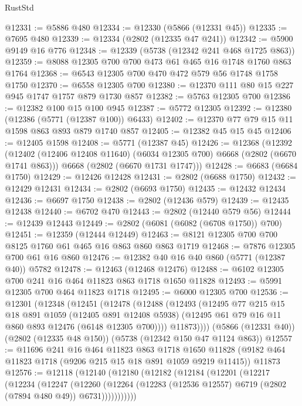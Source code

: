 \begin{lexlean}{RustStd}
\begin{coremodule}
@12331 := @5886 @480
@12334 := @12330 (@5866 (@12331 @45))
@12335 := @7695 @480
@12339 := @12334 (@2802 (@12335 @47 @241))
@12342 := @5900 @9149 @16 @776
@12348 := @12339 (@5738 (@12342 @241 @468 @1725 @863))
@12359 := @8088 @12305 @700 @700 @473 @61 @465 @16 @1748 @1760 @863 @1764
@12368 := @6543 @12305 @700 @470 @472 @579 @56 @1748 @1758 @1750
@12370 := @6558 @12305 @700
@12380 := @12370 @111 @80 @15 @227 @945 @1747 @1757 @879 @1730 @857
@12382 := @5763 @12305 @700
@12386 := @12382 @100 @15 @100 @945
@12387 := @5772 @12305
@12392 := @12380 (@12386 (@5771 (@12387 @100)) @6433)
@12402 := @12370 @77 @79 @15 @11 @1598 @863 @893 @879 @1740 @857
@12405 := @12382 @45 @15 @45
@12406 := @12405 @1598
@12408 := @5771 (@12387 @45)
@12426 := @12368
    (@12392
      (@12402 (@12406 @12408 @11640) (@6034 @12305 @700) @6668 (@2802 (@6670 @1741 @863)))
      @6668
      (@2802 (@6670 @1731 @1747)))
@12428 := @6683 (@6684 @1750)
@12429 := @12426 @12428
@12431 := @2802 (@6688 @1750)
@12432 := @12429 @12431
@12434 := @2802 (@6693 @1750)
@12435 := @12432 @12434
@12436 := @6697 @1750
@12438 := @2802 (@12436 @579)
@12439 := @12435 @12438
@12440 := @6702 @470
@12443 := @2802 (@12440 @579 @56)
@12444 := @12439 @12443
@12449 := @2802 (@6081 (@6082 (@6708 @1750)) @700)
@12451 := @12359 (@12444 @12449)
@12463 := @8121 @12305 @700 @700 @8125 @1760 @61 @465 @16 @863 @860 @863 @1719
@12468 := @7876 @12305 @700 @61 @16 @860
@12476 := @12382 @40 @16 @40 @860 (@5771 (@12387 @40)) @5782
@12478 := @12463 (@12468 @12476)
@12488 := @6102 @12305 @700 @241 @16 @464 @11823 @863 @1718 @1650 @11828
@12493 := @5991 @12305 @700 @464 @11823 @1718
@12495 := @6000 @12305 @700
@12536 := @12301
    (@12348
      (@12451
        (@12478
          (@12488
            (@12493
              (@12495
                @77
                @215
                @15
                @18
                @891
                @1059
                (@12405 @891 @12408 @5938)
                (@12495 @61 @79 @16 @11 @860 @893 @12476 (@6148 @12305 @700))))
            @11873))))
    (@5866 (@12331 @40))
    (@2802 (@12335 @48 @150))
    (@5738 (@12342 @150 @47 @1124 @863))
@12557 := @11696
    @241
    @16
    @464
    @11823
    @863
    @1718
    @1650
    @11828
    (@9182 @464 @11823 @1718 (@9206 @215 @15 @18 @891 @1059 @9219 @11415))
    @11873
@12576 := @12118
    (@12140
      (@12180
        (@12182
          (@12184
            (@12201
              (@12217
                (@12234
                  (@12247
                    (@12260
                      (@12264
                        (@12283 (@12536 @12557) @6719 (@2802 (@7894 @480 @49)) @6731)))))))))))

\end{coremodule}
\end{lexlean}
